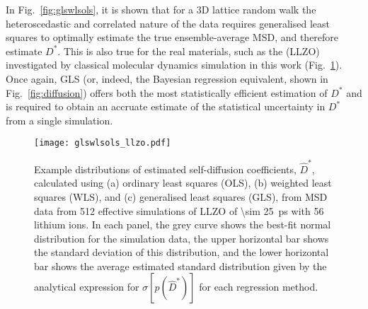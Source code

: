 \documentclass[reprint,superscriptaddress,nobibnotes,amsmath,amssymb,aps,prx,hidelinks,linenumbers]{revtex4-2}
\newcommand{\prob}[1]{\ensuremath{p(#1)}}
\newcommand{\Dest}{\ensuremath{\widehat{D}^*}}
\newcommand{\D}{\ensuremath{D^*}}
\begin{document}
In Fig.~\ref{fig:glswlsols}, it is shown that for a 3D lattice random walk the heteroscedastic and correlated nature of the data requires generalised least squares to optimally estimate the true ensemble-average MSD, and therefore estimate $\D$. 
This is also true for the real materials, such as the  (LLZO) investigated by classical molecular dynamics simulation in this work (Fig.~\ref{fig:glswlsols_llzo}).
Once again, GLS (or, indeed, the Bayesian regression equivalent, shown in Fig.~\ref{fig:diffusion}) offers both the most statistically efficient estimation of $\D$ and is required to obtain an accruate estimate of the statistical uncertainty in $\D$ from a single simulation. 
\begin{figure}
    \centering
    \texttt{[image: glswlsols\_llzo.pdf]}
    \caption{
        Example distributions of estimated self-diffusion coefficients, $\Dest$, calculated using (a) ordinary least squares (OLS), (b) weighted least squares (WLS), and (c) generalised least squares (GLS),
        from MSD data from \num{512} effective simulations of LLZO of \SI{\sim 25}{\pico\second} with 56 lithium ions.
        In each panel, the grey curve shows the best-fit normal distribution for the simulation data, the upper horizontal bar shows the standard deviation of this distribution, and the lower horizontal bar shows the average estimated standard distribution given by the analytical expression for $\sigma[\prob{\Dest}]$ for each regression method.}
    \label{fig:glswlsols_llzo}
\end{figure}
\end{document}
